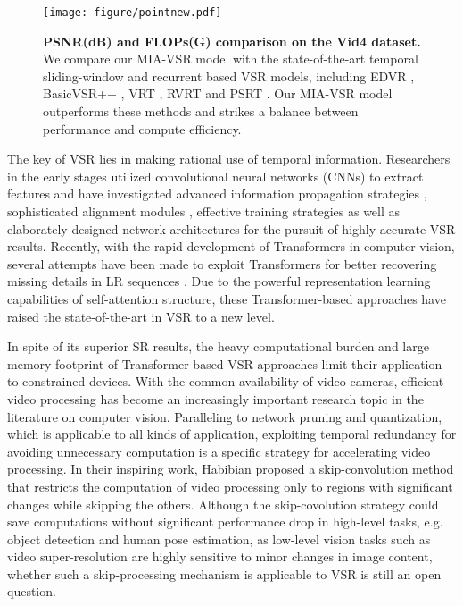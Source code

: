 \documentclass[10pt,twocolumn,letterpaper]{article}
\begin{document}
\begin{figure}
\hspace{-0.46cm}
\texttt{[image: figure/pointnew.pdf]}
\caption{\textbf{PSNR(dB) and FLOPs(G) comparison on the Vid4 \cite{liu2013bayesian} dataset.} We compare our MIA-VSR model with the state-of-the-art temporal sliding-window and recurrent based VSR models, including EDVR \cite{wang2019edvr}, BasicVSR++ \cite{chan2022basicvsr++}, VRT \cite{liang2022vrt}, RVRT \cite{liang2022recurrent} and PSRT \cite{shi2022rethinking}. Our MIA-VSR model outperforms these methods and strikes a balance between performance and compute efficiency.}
\label{fig:IIABwithmask}
\end{figure}
The key of VSR lies in making rational use of temporal information. 
%
Researchers in the early stages utilized convolutional neural networks (CNNs) to extract features and have investigated advanced information propagation strategies \cite{fuoli2019efficient,isobe2020video,chan2021basicvsr,chan2022basicvsr++,shi2022rethinking}, sophisticated alignment modules \cite{wang2019edvr,chan2021basicvsr,tian2020tdan,liang2022recurrent,shi2022rethinking,xu2023implicit}, effective training strategies \cite{xiao2021space, lin2023accelerating} as well as elaborately designed network architectures \cite{li2020mucan,isobe2022look} for the pursuit of highly accurate VSR results.
%
Recently, with the rapid development of Transformers in computer vision,  
several attempts have been made to exploit Transformers for better recovering missing details in LR sequences \cite{liang2022vrt,qiu2022learning,liu2022learning,liang2022recurrent, shi2022rethinking}. 
%
Due to the powerful representation learning capabilities of self-attention structure, these Transformer-based approaches have raised the state-of-the-art in VSR to a new level.

In spite of its superior SR results, the heavy computational burden and large memory footprint \cite{liang2022vrt, liang2022recurrent, shi2022rethinking} of Transformer-based VSR approaches limit their application to constrained devices.
%
With the common availability of video cameras, efficient video processing has become an increasingly important research topic in the literature on computer vision.
%
Paralleling to network pruning and quantization, which is applicable to all kinds of application, exploiting temporal redundancy for avoiding unnecessary computation is a specific strategy for accelerating video processing.
%
In their inspiring work, Habibian \etal\cite{habibian2021skip} proposed a skip-convolution method that restricts the computation of video processing only to regions with significant changes while skipping the others. 
%
Although the skip-covolution strategy could save computations without significant performance drop in high-level tasks, e.g. object detection and
human pose estimation, as low-level vision tasks such as video super-resolution are highly sensitive to minor changes in image content, 
whether such a skip-processing mechanism is applicable to VSR is still an open question.
%
\end{document}
